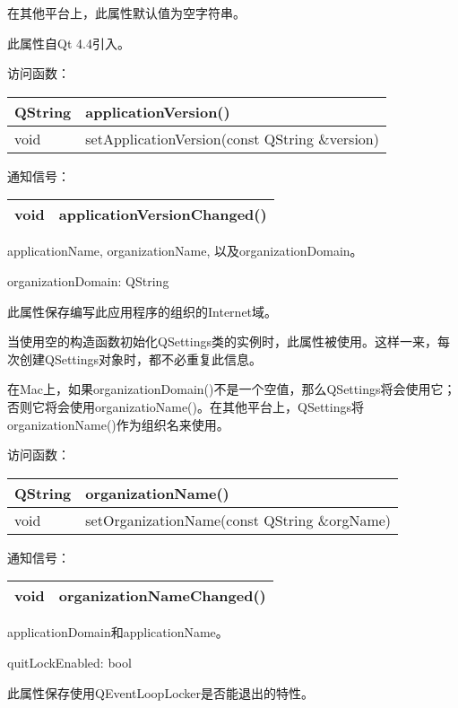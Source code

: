 在其他平台上，此属性默认值为空字符串。

此属性自Qt 4.4引入。

访问函数：

\begin{tabular}{|l|l|}
\hline
QString&	applicationVersion()\\
\hline
void&	setApplicationVersion(const QString \&version)\\
\hline
\end{tabular}

通知信号：

\begin{tabular}{|l|l|}
\hline
void	&applicationVersionChanged()\\
\hline
\end{tabular}

\begin{seeAlso}
applicationName, organizationName, 以及organizationDomain。
\end{seeAlso}

organizationDomain: QString

此属性保存编写此应用程序的组织的Internet域。

当使用空的构造函数初始化QSettings类的实例时，此属性被使用。这样一来，每次创建QSettings对象时，都不必重复此信息。

在Mac上，如果organizationDomain()不是一个空值，那么QSettings将会使用它；否则它将会使用organizatioName()。在其他平台上，QSettings将organizationName()作为组织名来使用。

访问函数：

\begin{tabular}{|l|l|}
\hline
QString&	organizationName()\\
\hline
void&	setOrganizationName(const QString \&orgName)\\
\hline
\end{tabular}

通知信号：

\begin{tabular}{|l|l|}
\hline
void	&organizationNameChanged()\\
\hline
\end{tabular}

\begin{seeAlso}
 applicationDomain和applicationName。
\end{seeAlso}

quitLockEnabled: bool

此属性保存使用QEventLoopLocker是否能退出的特性。

